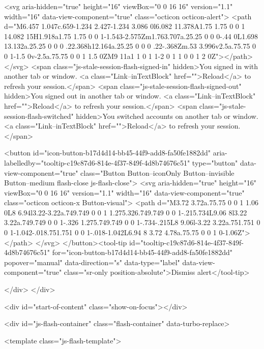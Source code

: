         <svg aria-hidden="true" height="16" viewBox="0 0 16 16" version="1.1" width="16" data-view-component="true" class="octicon octicon-alert">
    <path d="M6.457 1.047c.659-1.234 2.427-1.234 3.086 0l6.082 11.378A1.75 1.75 0 0 1 14.082 15H1.918a1.75 1.75 0 0 1-1.543-2.575Zm1.763.707a.25.25 0 0 0-.44 0L1.698 13.132a.25.25 0 0 0 .22.368h12.164a.25.25 0 0 0 .22-.368Zm.53 3.996v2.5a.75.75 0 0 1-1.5 0v-2.5a.75.75 0 0 1 1.5 0ZM9 11a1 1 0 1 1-2 0 1 1 0 0 1 2 0Z"></path>
</svg>
        <span class="js-stale-session-flash-signed-in" hidden>You signed in with another tab or window. <a class="Link--inTextBlock" href="">Reload</a> to refresh your session.</span>
        <span class="js-stale-session-flash-signed-out" hidden>You signed out in another tab or window. <a class="Link--inTextBlock" href="">Reload</a> to refresh your session.</span>
        <span class="js-stale-session-flash-switched" hidden>You switched accounts on another tab or window. <a class="Link--inTextBlock" href="">Reload</a> to refresh your session.</span>

    <button id="icon-button-b17d4d14-bb45-44f9-add8-fa50fe1882dd" aria-labelledby="tooltip-c19c87d6-814e-4f37-849f-4d8b74676c51" type="button" data-view-component="true" class="Button Button--iconOnly Button--invisible Button--medium flash-close js-flash-close">  <svg aria-hidden="true" height="16" viewBox="0 0 16 16" version="1.1" width="16" data-view-component="true" class="octicon octicon-x Button-visual">
    <path d="M3.72 3.72a.75.75 0 0 1 1.06 0L8 6.94l3.22-3.22a.749.749 0 0 1 1.275.326.749.749 0 0 1-.215.734L9.06 8l3.22 3.22a.749.749 0 0 1-.326 1.275.749.749 0 0 1-.734-.215L8 9.06l-3.22 3.22a.751.751 0 0 1-1.042-.018.751.751 0 0 1-.018-1.042L6.94 8 3.72 4.78a.75.75 0 0 1 0-1.06Z"></path>
</svg>
</button><tool-tip id="tooltip-c19c87d6-814e-4f37-849f-4d8b74676c51" for="icon-button-b17d4d14-bb45-44f9-add8-fa50fe1882dd" popover="manual" data-direction="s" data-type="label" data-view-component="true" class="sr-only position-absolute">Dismiss alert</tool-tip>


  
</div>
    </div>

  <div id="start-of-content" class="show-on-focus"></div>








    <div id="js-flash-container" class="flash-container" data-turbo-replace>




  <template class="js-flash-template">
    
